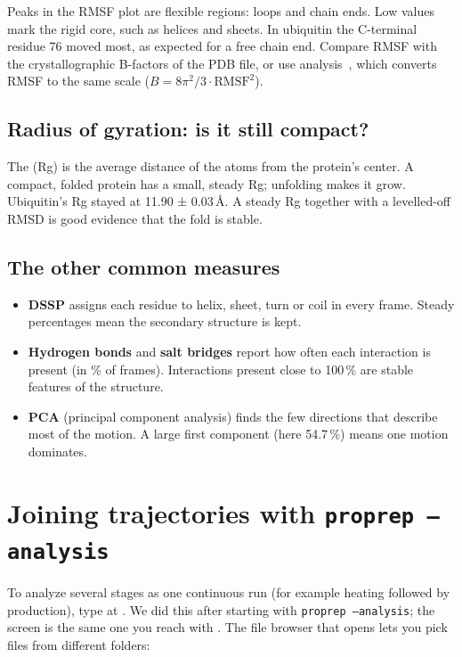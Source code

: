 Peaks in the RMSF plot are flexible regions: loops and chain ends. Low values
mark the rigid core, such as helices and sheets. In ubiquitin the C-terminal
residue 76 moved most, as expected for a free chain end. Compare RMSF with
the crystallographic B-factors of the PDB file, or use analysis~, which
converts RMSF to the same scale ($B = 8\pi^2/3 \cdot \mathrm{RMSF}^2$).

\subsection{Radius of gyration: is it still compact?}

The  (Rg) is the average distance of the atoms from
the protein's center. A compact, folded protein has a small, steady Rg;
unfolding makes it grow. Ubiquitin's Rg stayed at 11.90 ± 0.03\,Å. A steady
Rg together with a levelled-off RMSD is good evidence that the fold is
stable.

\subsection{The other common measures}

\begin{itemize}
  \item \textbf{DSSP} assigns each residue to helix, sheet, turn or coil in
        every frame. Steady percentages mean the secondary structure is kept.
  \item \textbf{Hydrogen bonds} and \textbf{salt bridges} report how often
        each interaction is present (in \% of frames). Interactions present
        close to 100\,\% are stable features of the structure.
  \item \textbf{PCA} (principal component analysis) finds the few directions
        that describe most of the motion. A large first component (here
        54.7\,\%) means one motion dominates.
\end{itemize}

\section{Joining trajectories with \texttt{proprep --analysis}}\label{sec:analysis-join}

To analyze several stages as one continuous run (for example heating
followed by production), type  at .
We did this after starting with \texttt{proprep --analysis}; the
 screen is the same one you reach with 
. The file browser that opens lets you pick files from different
folders:

